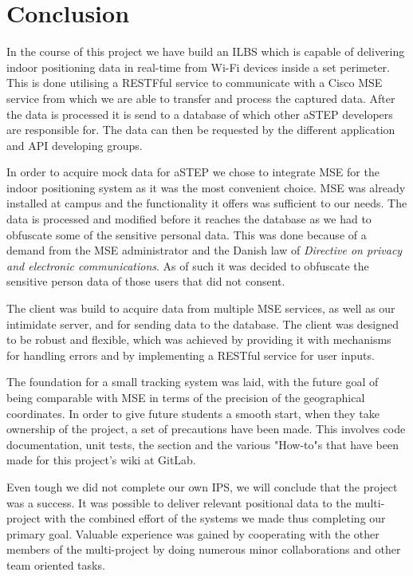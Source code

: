 \chapter{Conclusion}
In the course of this project we have build an ILBS which is capable of delivering indoor positioning data in real-time from Wi-Fi devices inside a set perimeter. This is done utilising a RESTFful service to communicate with a Cisco MSE service from which we are able to transfer and process the captured data. After the data is processed it is send to a database of which other aSTEP developers are responsible for. The data can then be requested by the different application and API developing groups.

In order to acquire mock data for aSTEP we chose to integrate MSE for the indoor positioning system as it was the most convenient choice. MSE was already installed at campus and the functionality it offers was sufficient to our needs. The data is processed and modified before it reaches the database as we had to obfuscate some of the sensitive personal data. This was done because of a demand from the MSE administrator and the Danish law of \textit{Directive on privacy and electronic communications}. As of such it was decided to obfuscate the sensitive person data of those users that did not consent.

The client was build to acquire data from multiple MSE services, as well as our intimidate server, and for sending data to the database. The client was designed to be robust and flexible, which was achieved by providing it with mechanisms for handling errors and by implementing a RESTful service for user inputs.

The foundation for a small tracking system was laid, with the future goal of being comparable with MSE in terms of the precision of the geographical coordinates. %
In order to give future students a smooth start, when they take ownership of the project, a set of precautions have been made. This involves code documentation, unit tests, the section  and the various "How-to"s that have been made for this project's wiki at GitLab. 

Even tough we did not complete our own IPS, we will conclude that the project was a success. It was possible to deliver relevant positional data to the multi-project with the combined effort of the systems we made thus completing our primary goal. Valuable experience was gained by cooperating with the other members of the multi-project by doing numerous minor collaborations and other team oriented tasks.